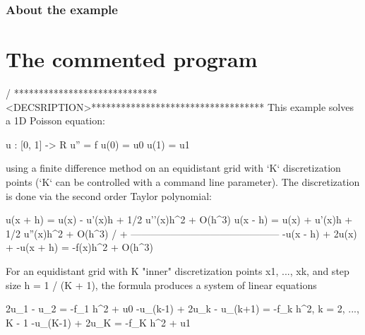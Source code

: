 \label{_Abouttheexample}%
\subsubsection*{About the example }

\label{_CommProg}%
 \section*{The commented program}


\begin{DoxyCode}
/ *****************************<DECSRIPTION>***********************************
This example solves a 1D Poisson equation:

    u : [0, 1] -> R
    u\textcolor{stringliteral}{''} = f
    u(0) = u0
    u(1) = u1

\textcolor{keyword}{using} a finite difference method on an equidistant grid with `K` discretization
points (`K` can be controlled with a command line parameter). The discretization
is done via the second order Taylor polynomial:

u(x + h) = u(x) - u\textcolor{stringliteral}{'(x)h + 1/2 u'}\textcolor{stringliteral}{'(x)h^2 + O(h^3)}
\textcolor{stringliteral}{u(x - h) = u(x) + u'}(x)h + 1/2 u\textcolor{stringliteral}{''}(x)h^2 + O(h^3)  / +
---------------------------------------------
-u(x - h) + 2u(x) + -u(x + h) = -f(x)h^2 + O(h^3)

For an equidistant grid with K \textcolor{stringliteral}{"inner"} discretization points x1, ..., xk, and
step size h = 1 / (K + 1), the formula produces a system of linear equations

           2u\_1 - u\_2     = -f\_1 h^2 + u0
-u\_(k-1) + 2u\_k - u\_(k+1) = -f\_k h^2,       k = 2, ..., K - 1
-u\_(K-1) + 2u\_K           = -f\_K h^2 + u1



\end{DoxyCode}
